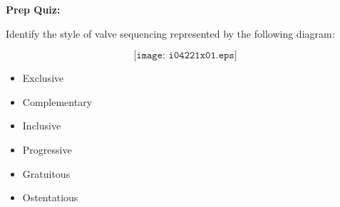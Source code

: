 \vfil \eject

\noindent
{\bf Prep Quiz:}

Identify the style of valve sequencing represented by the following diagram:

$$\texttt{[image: i04221x01.eps]}$$

\begin{itemize}
\item{} Exclusive
\vskip 5pt 
\item{} Complementary
\vskip 5pt 
\item{} Inclusive
\vskip 5pt 
\item{} Progressive
\vskip 5pt 
\item{} Gratuitous
\vskip 5pt 
\item{} Ostentatious
\end{itemize}





